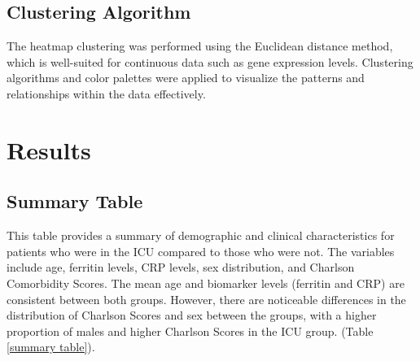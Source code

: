 \documentclass[12pt]{article}
\begin{document}
\subsection{Clustering Algorithm}
The heatmap clustering was performed using the Euclidean distance method, which is well-suited for continuous data such as gene expression levels. Clustering algorithms and color palettes were applied to visualize the patterns and relationships within the data effectively.\cite{Ultsch2022}

\section{Results}
\subsection{Summary Table}
This table provides a summary of demographic and clinical characteristics for patients who were in the ICU compared to those who were not. The variables include age, ferritin levels, CRP levels, sex distribution, and Charlson Comorbidity Scores. The mean age and biomarker levels (ferritin and CRP) are consistent between both groups. However, there are noticeable differences in the distribution of Charlson Scores and sex between the groups, with a higher proportion of males and higher Charlson Scores in the ICU group. (Table \ref{summary table}).
\end{document}
